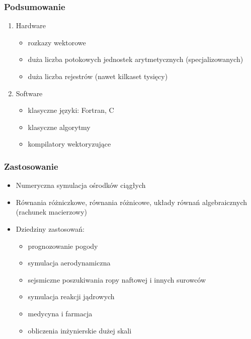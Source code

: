 		\subsubsection{Podsumowanie}
			\begin{enumerate}
				\item Hardware
				\begin{itemize}
					\item rozkazy wektorowe
					\item duża liczba potokowych jednostek arytmetycznych (specjalizowanych)
					\item duża liczba rejestrów (nawet kilkaset tysięcy)
				\end{itemize}
				\item Software
				\begin{itemize}
					\item klasyczne języki: Fortran, C
					\item klasyczne algorytmy
					\item kompilatory wektoryzujące
				\end{itemize}
			\end{enumerate}

		\subsubsection{Zastosowanie}
			\begin{itemize}
				\item Numeryczna symulacja ośrodków ciągłych
				\item Równania różniczkowe, równania różnicowe, układy równań algebraicznych (rachunek macierzowy)
				\item Dziedziny zastosowań:
				\begin{itemize}
					\item prognozowanie pogody
					\item symulacja aerodynamiczna
					\item sejsmiczne poszukiwania ropy naftowej i innych surowców
					\item symulacja reakcji jądrowych
					\item medycyna i farmacja
					\item obliczenia inżynierskie dużej skali
				\end{itemize}
			\end{itemize}
	
